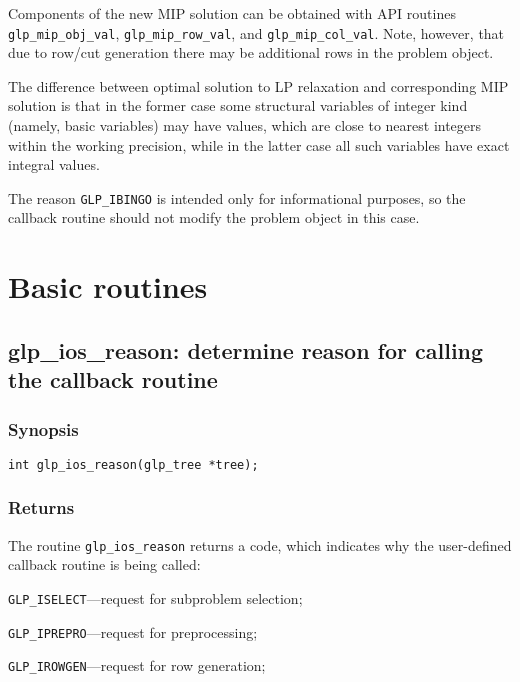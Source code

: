 Components of the new MIP solution can be obtained with API routines
\verb|glp_mip_obj_val|, \verb|glp_mip_row_val|, and
\verb|glp_mip_col_val|. Note, however, that due to row/cut generation
there may be additional rows in the problem object.

The difference between optimal solution to LP relaxation and
corresponding MIP solution is that in the former case some structural
variables of integer kind (namely, basic variables) may have values,
which are close to nearest integers within the working precision, while
in the latter case all such variables have exact integral values.

The reason \verb|GLP_IBINGO| is intended only for informational
purposes, so the callback routine should not modify the problem object
in this case.


\newpage

\section{Basic routines}

\subsection{glp\_ios\_reason: determine reason for calling the callback
routine}

\subsubsection*{Synopsis}

\begin{verbatim}
int glp_ios_reason(glp_tree *tree);
\end{verbatim}

\subsubsection*{Returns}

The routine \verb|glp_ios_reason| returns a code, which indicates why
the user-defined callback routine is being called:

\verb|GLP_ISELECT|---request for subproblem selection;

\verb|GLP_IPREPRO|---request for preprocessing;

\verb|GLP_IROWGEN|---request for row generation;

